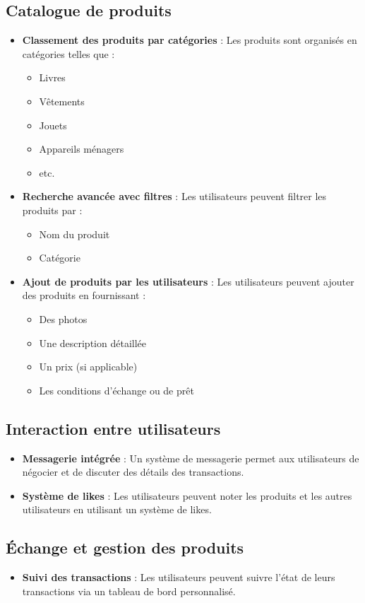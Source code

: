 \documentclass[12pt,a4paper]{report}
\begin{document}
	\subsection{Catalogue de produits}
	\begin{itemize}
		\item \textbf{Classement des produits par catégories} : Les produits sont organisés en catégories telles que :
		\begin{itemize}
			\item Livres
			\item Vêtements
			\item Jouets
			\item Appareils ménagers
			\item etc.
		\end{itemize}
		\item \textbf{Recherche avancée avec filtres} : Les utilisateurs peuvent filtrer les produits par :
		\begin{itemize}
			\item Nom du produit
			\item Catégorie
		\end{itemize}
		\item \textbf{Ajout de produits par les utilisateurs} : Les utilisateurs peuvent ajouter des produits en fournissant :
		\begin{itemize}
			\item Des photos
			\item Une description détaillée
			\item Un prix (si applicable)
			\item Les conditions d'échange ou de prêt
		\end{itemize}
	\end{itemize}
	
	\subsection{Interaction entre utilisateurs}
	\begin{itemize}
		\item \textbf{Messagerie intégrée} : Un système de messagerie permet aux utilisateurs de négocier et de discuter des détails des transactions.
		\item \textbf{Système de likes} : Les utilisateurs peuvent noter les produits et les autres utilisateurs en utilisant un système de likes.
	\end{itemize}
	
	\subsection{Échange et gestion des produits}
	\begin{itemize}
		\item \textbf{Suivi des transactions} : Les utilisateurs peuvent suivre l'état de leurs transactions via un tableau de bord personnalisé.
	\end{itemize}
	
\end{document}

